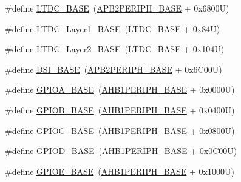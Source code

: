 \begin{DoxyCompactItemize}
\item 
\#define \hyperlink{group___peripheral__memory__map_gac6e45c39fafa3e82cdedbf447b461704}{L\+T\+D\+C\+\_\+\+B\+A\+SE}~(\hyperlink{group___peripheral__memory__map_ga25b99d6065f1c8f751e78f43ade652cb}{A\+P\+B2\+P\+E\+R\+I\+P\+H\+\_\+\+B\+A\+SE} + 0x6800\+U)
\item 
\#define \hyperlink{group___peripheral__memory__map_ga81a2641d0a8e698f32b160b2d20d070b}{L\+T\+D\+C\+\_\+\+Layer1\+\_\+\+B\+A\+SE}~(\hyperlink{group___peripheral__memory__map_gac6e45c39fafa3e82cdedbf447b461704}{L\+T\+D\+C\+\_\+\+B\+A\+SE} + 0x84\+U)
\item 
\#define \hyperlink{group___peripheral__memory__map_ga696614b764a3820d9f9560a0eec1e111}{L\+T\+D\+C\+\_\+\+Layer2\+\_\+\+B\+A\+SE}~(\hyperlink{group___peripheral__memory__map_gac6e45c39fafa3e82cdedbf447b461704}{L\+T\+D\+C\+\_\+\+B\+A\+SE} + 0x104\+U)
\item 
\#define \hyperlink{group___peripheral__memory__map_gac094188b138a77bbac13d9361609b617}{D\+S\+I\+\_\+\+B\+A\+SE}~(\hyperlink{group___peripheral__memory__map_ga25b99d6065f1c8f751e78f43ade652cb}{A\+P\+B2\+P\+E\+R\+I\+P\+H\+\_\+\+B\+A\+SE} + 0x6\+C00\+U)
\item 
\#define \hyperlink{group___peripheral__memory__map_gad7723846cc5db8e43a44d78cf21f6efa}{G\+P\+I\+O\+A\+\_\+\+B\+A\+SE}~(\hyperlink{group___peripheral__memory__map_ga811a9a4ca17f0a50354a9169541d56c4}{A\+H\+B1\+P\+E\+R\+I\+P\+H\+\_\+\+B\+A\+SE} + 0x0000\+U)
\item 
\#define \hyperlink{group___peripheral__memory__map_gac944a89eb789000ece920c0f89cb6a68}{G\+P\+I\+O\+B\+\_\+\+B\+A\+SE}~(\hyperlink{group___peripheral__memory__map_ga811a9a4ca17f0a50354a9169541d56c4}{A\+H\+B1\+P\+E\+R\+I\+P\+H\+\_\+\+B\+A\+SE} + 0x0400\+U)
\item 
\#define \hyperlink{group___peripheral__memory__map_ga26f267dc35338eef219544c51f1e6b3f}{G\+P\+I\+O\+C\+\_\+\+B\+A\+SE}~(\hyperlink{group___peripheral__memory__map_ga811a9a4ca17f0a50354a9169541d56c4}{A\+H\+B1\+P\+E\+R\+I\+P\+H\+\_\+\+B\+A\+SE} + 0x0800\+U)
\item 
\#define \hyperlink{group___peripheral__memory__map_ga1a93ab27129f04064089616910c296ec}{G\+P\+I\+O\+D\+\_\+\+B\+A\+SE}~(\hyperlink{group___peripheral__memory__map_ga811a9a4ca17f0a50354a9169541d56c4}{A\+H\+B1\+P\+E\+R\+I\+P\+H\+\_\+\+B\+A\+SE} + 0x0\+C00\+U)
\item 
\#define \hyperlink{group___peripheral__memory__map_gab487b1983d936c4fee3e9e88b95aad9d}{G\+P\+I\+O\+E\+\_\+\+B\+A\+SE}~(\hyperlink{group___peripheral__memory__map_ga811a9a4ca17f0a50354a9169541d56c4}{A\+H\+B1\+P\+E\+R\+I\+P\+H\+\_\+\+B\+A\+SE} + 0x1000\+U)

\end{DoxyCompactItemize}
